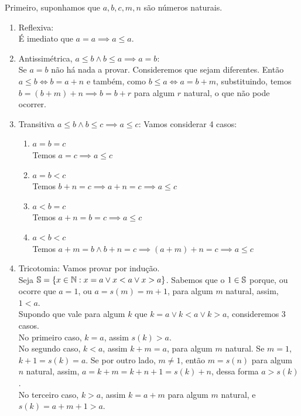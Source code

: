 \documentclass[../main.tex]{subfiles}
\begin{document}
\begin{dem}
    Primeiro, suponhamos que $a,b,c,m,n$ são números naturais.
    \begin{enumerate}[label=(\roman*)]
        \item Reflexiva: \\
            É imediato que $a = a \implies a \leq a$.
        \item Antissimétrica, $a \leq b \land b \leq a \implies a=b$: \\
            Se $a=b$ não há nada a provar. Consideremos que sejam diferentes.
            Então $a \leq b \iff b = a + n$ e também, como $b \leq a \iff a = b + m$, substituindo, temos $b = (b+m) + n \implies b = b+r$ para algum $r$ natural, o que não pode ocorrer. %
        \item Transitiva $a \leq b \land b \leq c \implies a \leq c$: 
            Vamos considerar 4 casos:
            \begin{enumerate}[label=(\arabic*)]
                \item $a = b = c$ \\
                    Temos $a = c \implies a \leq c$\\
                \item $a = b < c$ \\
                    Temos $ b + n = c \implies a + n = c\implies a \leq c$\\
                \item $a < b = c$ \\
                    Temos $a + n = b = c \implies a \leq c$\\
                \item $a < b < c$ \\
                    Temos $a + m = b \land b + n = c \implies ( a + m ) + n = c \implies a \leq c$
            \end{enumerate}
        \item Tricotomia:
        Vamos provar por indução. \\
        Seja $\S = \{ x \in \N : x = a \lor x < a \lor x > a \}$. Sabemos que o $1 \in \S$ porque, ou ocorre que $a = 1$, ou $a = s(m) = m + 1$, para algum $m$ natural, assim, $1 < a$. \\
        Supondo que vale para algum $k$ que $k = a \lor k < a \lor k > a$, consideremos 3 casos.  \\
        
        No primeiro caso, $k = a$, assim $s(k) > a$. \\
        No segundo caso, $k < a$, assim $k + m = a$, para algum $m$ natural. Se $m = 1$, $k+1 = s(k) = a$. Se por outro lado, $m \neq 1$, então $m = s(n)$ para algum $n$ natural, assim, $a = k + m = k + n + 1 = s(k) + n$, dessa forma $a > s(k)$. \\
        No terceiro caso, $k > a$, assim $k = a + m$ para algum $m$ natural, e $s(k) = a + m + 1 > a$.


\end{enumerate}
\end{dem}
\end{document}
